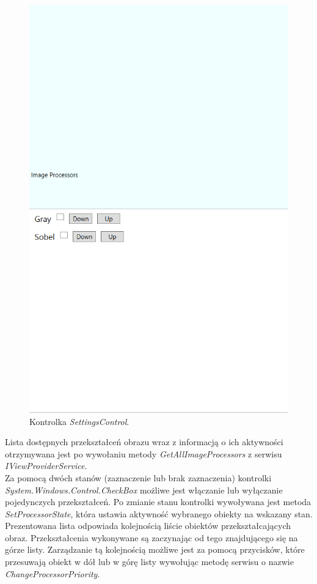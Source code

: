 \documentclass[a4paper,11pt,twoside]{report}
\theoremstyle{definition}
\begin{document}
\begin{description}
\begin{figure}[h]
\centering
\includegraphics[scale=0.3]{settingscontrol_screen}
\caption[Widok aplikacji]{Kontrolka \textit{SettingsControl}.}
\end{figure}

Lista dostępnych przekształceń obrazu wraz z informacją o ich aktywności otrzymywana jest po wywołaniu metody \textit{GetAllImageProcessors} z serwisu \textit{IViewProviderService}. \\
Za pomocą dwóch stanów (zaznaczenie lub brak zaznaczenia) kontrolki \textit{System.Windows.Control.CheckBox} możliwe jest włączanie lub wyłączanie pojedynczych przekształceń. Po zmianie stanu kontrolki wywoływana jest metoda \textit{SetProcessorState}, która ustawia aktywność wybranego obiekty na wskazany stan. \\
Prezentowana lista odpowiada kolejnością liście obiektów przekształcających obraz.  Przekształcenia wykonywane są zaczynając od tego znajdującego się na górze listy. Zarządzanie tą kolejnością możliwe jest za pomocą przycisków, które przesuwają obiekt w dół lub w górę listy wywołując metodę serwisu o nazwie \textit{ChangeProcessorPriority}.

\end{description}
\end{document}
